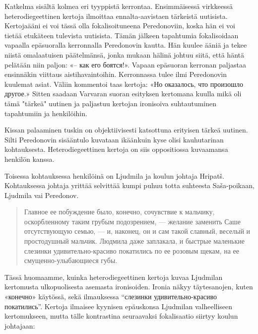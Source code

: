 \documentclass[12pt,a4paper]{article}
\begin{document}
Katkelma sisältä kolmea eri tyyppistä kerrontaa. Ensimmäisessä virkkeessä
heterodiegeettinen kertoja ilmoittaa ennalta-aavistaen tärkeistä uutisista.
Kertojaääni ei voi tässä olla fokalisoituneena Peredonoviin, koska
hän ei voi tietää etukäteen tulevista uutisista. Tämän jälkeen tapahtumia
fokalisoidaan vapaalla epäsuoralla kerronnalla Peredonovin kautta.
Hän kuulee ääniä ja tekee niistä omalaatuisen päätelmänsä, jonka mukaan hälinä
johtuu siitä, että häntä pelätään niin paljon: «– как его боятся!».
Vapaan epäsuoran kerronan paljastaa ensinnäkin viittaus aistihavaintoihin. Kerronnassa tulee ilmi Peredonovin kuulemat asiat. Väliin kommentoi taas kertoja: «Но оказалось, что произошло другое.» Sitten saadaan
Varvaran suoran esityksen kertomana kuulla mikä oli tämä "tärkeä" uutinen ja
paljastuu kertojan ironisoiva suhtautuminen tapahtumiin ja henkilöihin.

Kissan palaaminen tuskin on objektiivisesti katsottuna erityisen tärkeä uutinen.
Silti Peredonovin sisääntulo kuvataan ikäänkuin kyse olisi kauhutarinan 
kohtauksesta. Heterodiegeettinen kertoja on siis oppositiossa kuvaamansa henkilön kanssa.

Toisessa kohtauksessa henkilöinä on Ljudmila ja koulun johtaja Hripatš. Kohtauksessa johtaja yrittää selvittää kumpi puhuu totta suhteesta Saša-poikaan, Ljudmila vai Peredonov.

\begin{quote}
Главное ее побуждение было,
конечно, сочувствие к мальчику, оскорбленному таким грубым 
подозрением, — желание заменить Саше отсутствующую семью, — и, 
наконец, он и сам такой славный, веселый и простодушный мальчик. 
Людмила даже заплакала, и быстрые маленькие слезинки 
удивительно-красиво покатились по ее розовым щекам, на ее смущенно-улыбающиеся
губы. \parencite[239]{sologub2004}
\end{quote}

Tässä huomaamme, kuinka heterodiegeettinen kertoja kuvaa Ljudmilan kertomusta ulkopuolisesta asemasta ironisoiden. Ironia näkyy täytesanojen,  kuten «конечно» käytössä, sekä ilmauksessa \enquote{слезинки 
удивительно-красиво покатились}. Kertoja ilmaisee kyynisen epäuskonsa Ljudmilan valheelliseen kertomukseen, mutta tälle kontrastina seuraavaksi fokalisaatio siirtyy koulun johtajaan:
\end{document}
